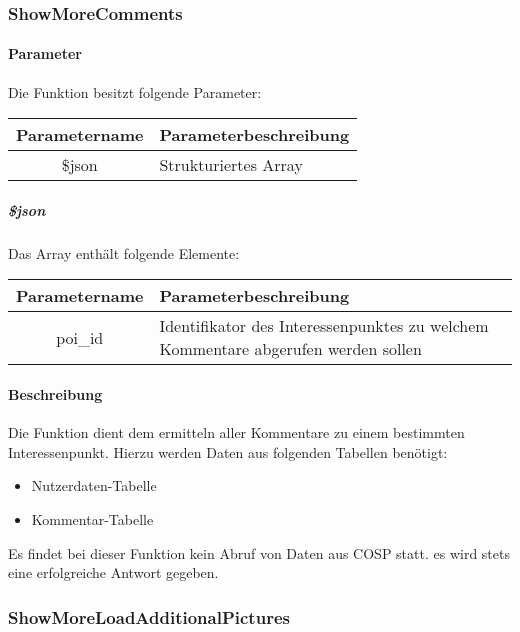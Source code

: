 \subsubsection{ShowMoreComments}
\paragraph{Parameter} Die Funktion besitzt folgende Parameter:
\begin{table}[H]
	\begin{tabular}{|c|p{11cm}|}
		\hline
		\textbf{Parametername} & \textbf{Parameterbeschreibung} \\ \hline
		\$json & Strukturiertes Array \\ \hline
	\end{tabular}
\end{table}
\subparagraph{\$json}Das Array enthält folgende Elemente:
\begin{table}[H]
	\begin{tabular}{|c|p{11cm}|}
		\hline
		\textbf{Parametername} & \textbf{Parameterbeschreibung} \\ \hline
		poi\_id & Identifikator des Interessenpunktes zu welchem Kommentare abgerufen werden sollen \\ \hline
	\end{tabular}
\end{table}
\paragraph{Beschreibung} Die Funktion dient dem ermitteln aller Kommentare zu einem bestimmten Interessenpunkt. Hierzu werden Daten aus folgenden Tabellen benötigt:
\begin{itemize}
	\item Nutzerdaten-Tabelle
	\item Kommentar-Tabelle
\end{itemize}
Es findet bei dieser Funktion kein Abruf von Daten aus {\glqq COSP\grqq} statt. es wird stets eine erfolgreiche Antwort gegeben.
\subsubsection{ShowMoreLoadAdditionalPictures}
